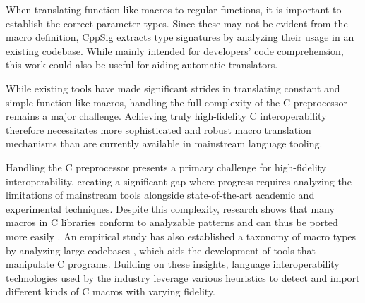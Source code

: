 When translating function-like macros to regular functions, it is important to establish the correct parameter types. Since these may not be evident from the macro definition, CppSig \cite{cppsig} extracts type signatures by analyzing their usage in an existing codebase. While mainly intended for developers' code comprehension, this work could also be useful for aiding automatic translators.

While existing tools have made significant strides in translating constant and simple function-like macros, handling the full complexity of the C preprocessor remains a major challenge. Achieving truly high-fidelity C interoperability therefore necessitates more sophisticated and robust macro translation mechanisms than are currently available in mainstream language tooling.


Handling the C preprocessor presents a primary challenge for high-fidelity interoperability, creating a significant gap where progress requires analyzing the limitations of mainstream tools alongside state-of-the-art academic and experimental techniques. Despite this complexity, research shows that many macros in C libraries conform to analyzable patterns and can thus be ported more easily \cite{Pappas_2024}. An empirical study has also established a taxonomy of macro types by analyzing large codebases \cite{usage-of-macros-study}, which aids the development of tools that manipulate C programs. Building on these insights, language interoperability technologies used by the industry leverage various heuristics to detect and import different kinds of C macros with varying fidelity.
